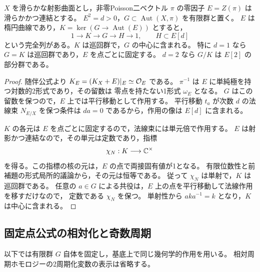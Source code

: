\begin{proposition}[滑らかな楕円零因子を持つ有限Poisson群]
\label{prop:ku-finite-poisson-group}
$X$ を滑らかな射影曲面とし，非零Poisson二ベクトル $\pi$ の零因子
$E=Z(\pi)$ は滑らかかつ連結とする。
$E^2=d>0$，$G\subset\operatorname{Aut}(X,\pi)$ を有限群と置く。
$E$ は楕円曲線であり，$K=\ker(G\to\operatorname{Aut}(E))$ とすると，
\[
 1\longrightarrow K\longrightarrow G\longrightarrow H\longrightarrow1,
 \qquad H\subset E[d]
\]
という完全列がある。$K$ は巡回群で，$G$ の中心に含まれる。
特に $d=1$ なら $G=K$ は巡回群であり，$E$ を点ごとに固定する。
$d=2$ なら $G/K$ は $E[2]$ の部分群である。
\end{proposition}
\begin{proof}
随伴公式より $K_E=(K_X+E)|_E\simeq\mathcal O_E$ である。
$\pi^{-1}$ は $E$ に単純極を持つ対数的2形式であり，その留数は
零点を持たない1形式 $\omega_E$ となる。
$G$ はこの留数を保つので，$E$ 上では平行移動として作用する。
平行移動 $t_a$ が次数 $d$ の法線束 $N_{E/X}$ を保つ条件は
$d a=0$ であるから，作用の像は $E[d]$ に含まれる。

$K$ の各元は $E$ を点ごとに固定するので，法線束には単元倍で作用する。
$E$ は射影かつ連結なので，その単元は定数であり，指標
\[
 \chi_N:K\longrightarrow\mathbb C^\times
\]
を得る。この指標の核の元は，$E$ の点で両接固有値が1となる。
有限位数性と前補題の形式局所的議論から，その元は恒等である。
従って $\chi_N$ は単射で，$K$ は巡回群である。
任意の $a\in G$ による共役は，$E$ 上の点を平行移動して法線作用を移すだけなので，
定数である $\chi_N$ を保つ。
単射性から $a k a^{-1}=k$ となり，$K$ は中心に含まれる。
\end{proof}

\subsection{固定点公式の相対化と奇数周期}

以下では有限群 $G$ 自体を固定し，基底上で同じ幾何学的作用を用いる。
相対周期ホモロジーの2周期化変数の表示は省略する。

